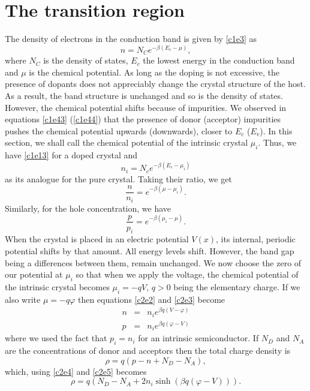 \section{The transition region}\label{c2s2}
The density of electrons in the conduction band is given by \eqref{c1e3} as
\[
n = N_C e^{-\beta(E_c - \mu)},
\]
where $N_C$ is the density of states, $E_c$ the lowest energy in the conduction
band and $\mu$ is the chemical potential. As long as the doping is not 
excessive, the presence of dopants does not appreciably change the crystal 
structure of the host. As a result, the band structure is unchanged and so is
the density of states. However, the chemical potential shifts because of 
impurities. We observed in equations \eqref{c1e43} (\eqref{c1e44}) that the
presence of donor (acceptor) impurities pushes the chemical potential upwards
(downwards), closer to $E_c$ ($E_v$). In this section, we shall call the 
chemical potential of the intrinsic crystal $\mu_i$. Thus, we have \eqref{c1e13}
for a doped crystal and
\begin{equation}\label{c2e1}
n_i = N_c e^{-\beta(E_c - \mu_i)}
\end{equation}
as its analogue for the pure crystal. Taking their ratio, we get
\begin{equation}\label{c2e2}
\frac{n}{n_i} = e^{-\beta(\mu - \mu_i)}.
\end{equation}
Similarly, for the hole concentration, we have
\begin{equation}\label{c2e3}
\frac{p}{p_i} = e^{-\beta(\mu_i - \mu)}.
\end{equation}
When the crystal is placed in an electric potential $V(x)$, its internal, 
periodic potential shifts by that amount. All energy levels shift. However, 
the band gap being a differences between them, remain unchanged. We now
choose the zero of our potential at $\mu_i$ so that when we apply the voltage,
the chemical potential of the intrinsic crystal becomes $\mu_i = -qV$, $q > 0$ 
being the elementary charge. If we also write $\mu = -q\varphi$ then equations
\eqref{c2e2} and \eqref{c2e3} become
\begin{eqnarray}
n &=& n_i e^{\beta q(V - \varphi)} \label{c2e4} \\
p &=& n_i e^{\beta q(\varphi - V)} \label{c2e5}
\end{eqnarray}
where we used the fact that $p_i = n_i$ for an intrinsic semiconductor. If
$N_D$ and $N_A$ are the concentrations of donor and acceptors then the total
charge density is
\begin{equation}\label{c2e6}
\rho = q(p - n + N_D - N_A),
\end{equation}
which, using \eqref{c2e4} and \eqref{c2e5} becomes
\begin{equation}\label{c2e7}
\rho = q(N_D - N_A + 2n_i\sinh(\beta q (\varphi - V))).
\end{equation}

